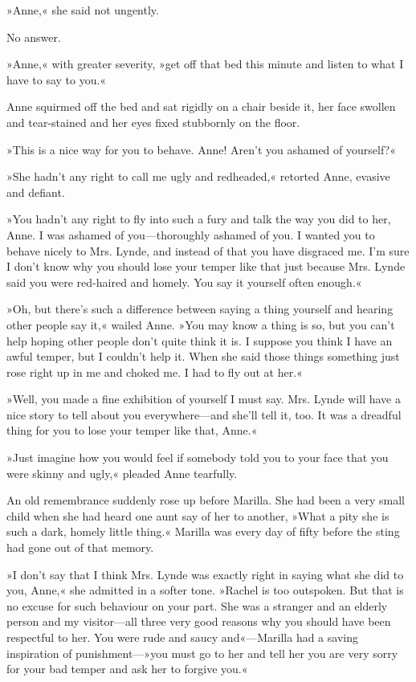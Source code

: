 »Anne,« she said not ungently.

No answer.

»Anne,« with greater severity, »get off that bed this minute and listen to what I have to say to you.«

Anne squirmed off the bed and sat rigidly on a chair beside it, her face swollen and tear-stained and her eyes fixed stubbornly on the floor.

»This is a nice way for you to behave. Anne! Aren’t you ashamed of yourself?«

»She hadn’t any right to call me ugly and redheaded,« retorted Anne, evasive and defiant.

»You hadn’t any right to fly into such a fury and talk the way you did to her, Anne. I was ashamed of you—thoroughly ashamed of you. I wanted you to behave nicely to Mrs. Lynde, and instead of that you have disgraced me. I’m sure I don’t know why you should lose your temper like that just because Mrs. Lynde said you were red-haired and homely. You say it yourself often enough.«

»Oh, but there’s such a difference between saying a thing yourself and hearing other people say it,« wailed Anne. »You may know a thing is so, but you can’t help hoping other people don’t quite think it is. I suppose you think I have an awful temper, but I couldn’t help it. When she said those things something just rose right up in me and choked me. I had to fly out at her.«

»Well, you made a fine exhibition of yourself I must say. Mrs. Lynde will have a nice story to tell about you everywhere—and she’ll tell it, too. It was a dreadful thing for you to lose your temper like that, Anne.«

»Just imagine how you would feel if somebody told you to your face that you were skinny and ugly,« pleaded Anne tearfully.

An old remembrance suddenly rose up before Marilla. She had been a very small child when she had heard one aunt say of her to another, »What a pity she is such a dark, homely little thing.« Marilla was every day of fifty before the sting had gone out of that memory.

»I don’t say that I think Mrs. Lynde was exactly right in saying what she did to you, Anne,« she admitted in a softer tone. »Rachel is too outspoken. But that is no excuse for such behaviour on your part. She was a stranger and an elderly person and my visitor—all three very good reasons why you should have been respectful to her. You were rude and saucy and«—Marilla had a saving inspiration of punishment—»you must go to her and tell her you are very sorry for your bad temper and ask her to forgive you.«

